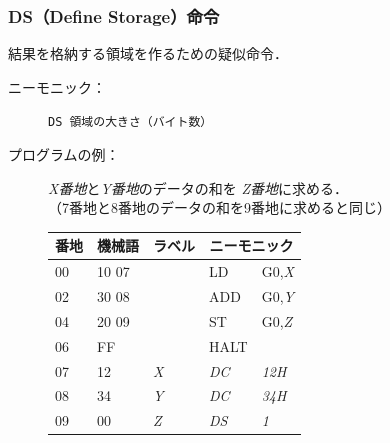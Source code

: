 \documentclass[handout]{beamer}        %
\begin{document}
\begin{frame}
  \frametitle{DS（Define Storage）命令}
  結果を格納する領域を作るための疑似命令．
  \begin{description}
  \item[ニーモニック：] \texttt{DS 領域の大きさ（バイト数）}
  \vfill

  \item[プログラムの例：]\emph{X番地}と\emph{Y番地}のデータの和を
    \emph{Z番地}に求める．\\
    （7番地と8番地のデータの和を9番地に求めると同じ）\\
    {\ttfamily\small\begin{center}
      \begin{tabular}{|l|l|l|l l|} \hline
        番地 & 機械語 & ラベル & \multicolumn{2}{|c|}{ニーモニック} \\
        \hline
        00 & 10 07 &          & LD        & G0,\emph{X}  \\
        02 & 30 08 &          & ADD       & G0,\emph{Y}  \\
        04 & 20 09 &          & ST        & G0,\emph{Z}  \\
        06 & FF    &          & HALT      &              \\
        07 & 12    & \emph{X} & \emph{DC} & \emph{12H}   \\
        08 & 34    & \emph{Y} & \emph{DC} & \emph{34H}   \\
        09 & 00    & \emph{Z} & \emph{DS} & \emph{1}     \\
        \hline
      \end{tabular}
    \end{center}}
    \vfill

  \end{description}
\end{frame}
\end{document}
